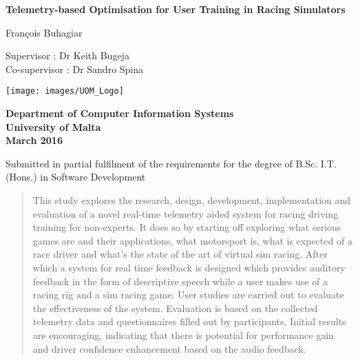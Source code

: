 \documentclass{report}
\begin{document}
\begin{titlepage}
	\begin{center}
		\begin{spacing}{1.5}
			\huge{\textbf{Telemetry-based Optimisation for User Training in Racing Simulators}}
		\end{spacing}
		
		\LARGE{Fran\c{c}ois Buhagiar
		
		Supervisor : Dr Keith Bugeja\\
		Co-supervisor : Dr Sandro Spina}
		
		\vspace{5mm}
		\texttt{[image: images/UOM\_Logo]}
		
		\vfill
		\begin{spacing}{1.5}
			\Large{\textbf{Department of Computer Information Systems\\
				University of Malta\\
				March 2016 }}
		\end{spacing}
		\vspace{10mm}
		\normalsize  Submitted in partial fulfilment of the requirements for the degree of B.Sc. I.T. (Hons.) in Software Development
		\clearpage
	\end{center}
\end{titlepage}


\newpage



\newpage
\begin{abstract}

This study explores the research, design, development, implementation and evaluation of a novel real-time telemetry aided system for racing driving training for non-experts. It does so by starting off exploring what serious games are and their applications, what motorsport is, what is expected of a race driver and what's the state of the art of virtual sim racing. After which a system for real time feedback is designed which provides auditory feedback in the form of descriptive speech while a user makes use of a racing rig and a sim racing game. User studies are carried out to evaluate the effectiveness of the system.  Evaluation is based on the collected telemetry data and questionnaires filled out by participants. Initial results are encouraging, indicating that there is potential for performance gain and driver confidence enhancement based on the audio feedback.


\end{abstract}
\end{document}

